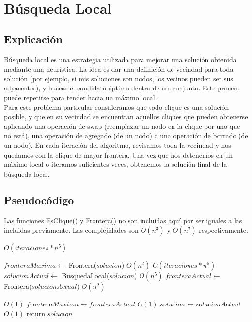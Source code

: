 \section{Búsqueda Local}

\subsection{Explicación}

Búsqueda local es una estrategia utilizada para mejorar una solución obtenida mediante una heurística. La idea es dar una definición de vecindad para toda solución (por ejemplo, si mis soluciones son nodos, los vecinos pueden ser sus adyacentes), y buscar el candidato óptimo dentro de ese conjunto. Este proceso puede repetirse para tender hacia un máximo local. \\

Para este problema particular consideramos que todo clique es una solución posible, y que en su vecindad se encuentran aquellos cliques que pueden obtenerse aplicando una operación de swap (reemplazar un nodo en la clique por uno que no está), una operación de agregado (de un nodo) o una operación de borrado (de un nodo). En cada iteración del algoritmo, revisamos toda la vecindad y nos quedamos con la clique de mayor frontera. Una vez que nos detenemos en un máximo local o iteramos suficientes veces, obtenemos la solución final de la búsqueda local. \\

\subsection{Pseudocódigo}

Las funciones EsClique() y Frontera() no son incluidas aquí por ser iguales a las incluidas previamente. Las complejidades son $O(n^3)$ y $O(n^2)$ respectivamente. \\

\begin{algorithm}[H]
\begin{algorithmic}
          \Comment $O(iteraciones * n^5)$

    \State $fronteraMaxima \gets$ Frontera($solucion$)                      \Comment $O(n^2)$
                                             \Comment $O(iteraciones * n^5)$
        \State $solucionActual \gets$ BusquedaLocal($solucion$)             \Comment $O(n^5)$
        \State $fronteraActual \gets$ Frontera($solucionActual$)            \Comment $O(n^2)$

                                      \Comment $O(1)$
            \State $fronteraMaxima \gets fronteraActual$                    \Comment $O(1)$
            \State $solucion \gets solucionActual$                          \Comment $O(1)$
        \EndIf
    \EndFor
    \State return $solucion$

\EndFunction
\end{algorithmic}
\end{algorithm}


